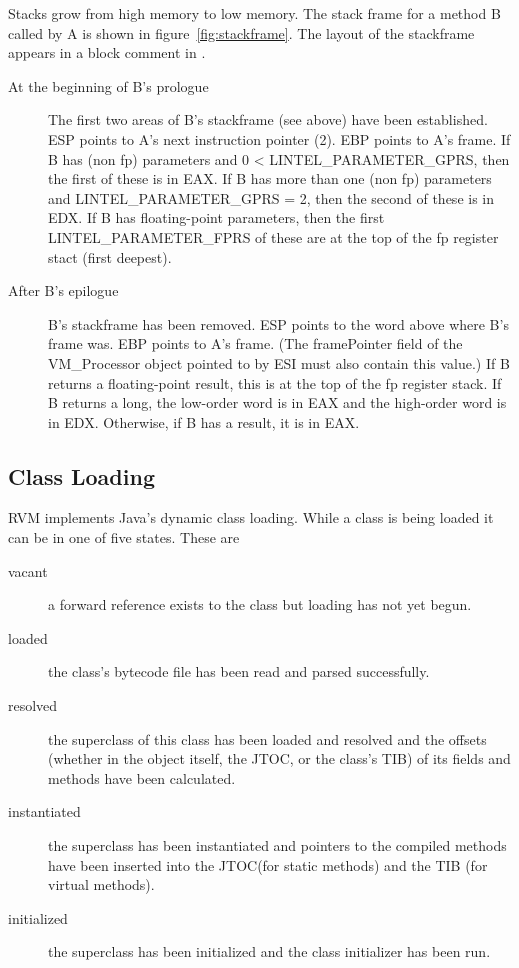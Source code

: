 
Stacks grow from high memory to low memory.  The stack frame for a method
B called by A is shown in figure~\ref{fig:stackframe}. 
The layout of the stackframe appears in a block comment in
{\LintelStackframeLayoutURL}.


\begin{description}
\item[At the beginning of B's prologue]
The first two areas of B's stackframe (see above) have been
     established.  ESP points to A's next instruction pointer (2).
     EBP points to A's frame.  If B has (non fp) parameters and
     0 < LINTEL\_PARAMETER\_GPRS, then the first of these is in EAX.
     If B has more than one (non fp) parameters and
     LINTEL\_PARAMETER\_GPRS = 2, then the second of these is in EDX.
     If B has floating-point parameters, then the first
     LINTEL\_PARAMETER\_FPRS of these are at the top of the fp register
     stact (first deepest).
\item[After B's epilogue]
B's stackframe has been removed.  ESP points to the word above where
     B's frame was.  EBP points to A's frame.  (The framePointer field
     of the VM\_Processor object pointed to by ESI must also contain
     this value.)  If B returns a floating-point result, this is at
     the top of the fp register stack.  If B returns a long, the
     low-order word is in EAX and the high-order word is in EDX.
     Otherwise, if B has a result, it is in EAX.

\end{description}

\subsection{Class Loading} \label{sssec:classLoading}

RVM implements Java's dynamic class loading. While a class is being loaded it
can be in one of five states. These are
\begin{description}
\item[vacant] a forward reference exists to the class but loading has not yet 
begun.
\item[loaded] the class's bytecode file has been read and parsed successfully.
\item[resolved] the superclass of this class has been loaded and resolved and
the offsets (whether in the object itself, the JTOC, or the class's TIB) of its 
fields and methods have been calculated.
\item[instantiated] the superclass has been instantiated and pointers to the
compiled methods have been inserted into the JTOC(for static methods) and the
TIB (for virtual methods).
\item[initialized] the superclass has been initialized and the class
initializer has been run.
\end{description}

